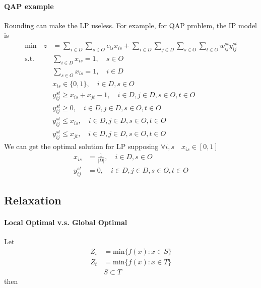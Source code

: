                 \paragraph{QAP example}
                    Rounding can make the LP useless. For example, for QAP problem, the IP model is
                    \begin{align*}
                        \text{min} \quad z &= \sum_{i\in D} \sum_{s\in O} c_{is} x_{is} + \sum_{i\in D} \sum_{j \in D} \sum_{s \in O} \sum_{t\in O} w_{ij}^{st}y_{ij}^{st}  \\
                        \text{s.t.} \quad & \sum_{i \in D} x_{is} =1, \quad s\in O  \\
                                    &\sum_{s \in O} x_{is} = 1, \quad i \in D  \\
                                    &x_{is} \in \{0, 1\}, \quad i \in D, s\in O  \\
                                    & y_{ij}^{st} \ge x_{is} + x_{jt} - 1, \quad i\in D, j\in D, s\in O, t \in O  \\
                                    & y_{ij}^{st} \ge 0, \quad i\in D, j\in D, s\in O, t \in O  \\
                                    & y_{ij}^{st} \le x_{is}, \quad i\in D, j\in D, s\in O, t \in O  \\
                                    & y_{ij}^{st} \le x_{jt}, \quad i\in D, j\in D, s\in O, t \in O  
                    \end{align*}
                    We can get the optimal solution for LP supposing $\forall i, s \quad x_{is}\in [0, 1]$
                    \begin{align*}
                        x_{is} &= \frac{1}{|D|}, \quad i \in D, s\in O   \\
                        y_{ij}^{st} & = 0, \quad i\in D, j\in D, s\in O, t \in O 
                    \end{align*}
                   
            \subsection{Relaxation}

                \paragraph{Local Optimal v.s. Global Optimal}
                    Let 
                    \begin{align*}
                        Z_s &= \text{min} \{f(x):x\in S\} \\
                        Z_t &= \text{min} \{f(x):x\in T\}  \\
                        & S \subset T 
                    \end{align*}
                    then

